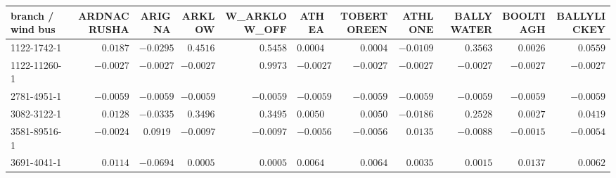 \setlength{\tabcolsep}{3pt}\renewcommand{\arraystretch}{1.05}
\begin{tabular}{l|rrrrrrrrrr}
{\tiny branch / wind bus} & {\tiny ARDNACRUSHA} & {\tiny ARIGNA} & {\tiny ARKLOW} & {\tiny W\_ARKLOW\_OFF} & {\tiny ATHEA} & {\tiny TOBERTOREEN} & {\tiny ATHLONE} & {\tiny BALLYWATER} & {\tiny BOOLTIAGH} & {\tiny BALLYLICKEY}\\ \hline
{\tiny 1122-1742-1} & $0.0187$ & $-0.0295$ & $0.4516$ & $0.5458$ & $0.0004$ & $0.0004$ & $-0.0109$ & $0.3563$ & $0.0026$ & $0.0559$\\
{\tiny 1122-11260-1} & $-0.0027$ & $-0.0027$ & $-0.0027$ & $0.9973$ & $-0.0027$ & $-0.0027$ & $-0.0027$ & $-0.0027$ & $-0.0027$ & $-0.0027$\\
{\tiny 2781-4951-1} & $-0.0059$ & $-0.0059$ & $-0.0059$ & $-0.0059$ & $-0.0059$ & $-0.0059$ & $-0.0059$ & $-0.0059$ & $-0.0059$ & $-0.0059$\\
{\tiny 3082-3122-1} & $0.0128$ & $-0.0335$ & $0.3496$ & $0.3495$ & $0.0050$ & $0.0050$ & $-0.0186$ & $0.2528$ & $0.0027$ & $0.0419$\\
{\tiny 3581-89516-1} & $-0.0024$ & $0.0919$ & $-0.0097$ & $-0.0097$ & $-0.0056$ & $-0.0056$ & $0.0135$ & $-0.0088$ & $-0.0015$ & $-0.0054$\\
{\tiny 3691-4041-1} & $0.0114$ & $-0.0694$ & $0.0005$ & $0.0005$ & $0.0064$ & $0.0064$ & $0.0035$ & $0.0015$ & $0.0137$ & $0.0062$
\end{tabular}
